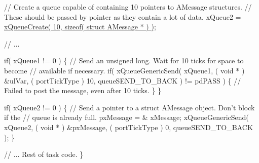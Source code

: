\begin{DoxyPre}   // Create a queue capable of containing 10 pointers to AMessage structures.
   // These should be passed by pointer as they contain a lot of data.
   xQueue2 = \hyperlink{queue_8h_aeb858b824bd74a934ea7ebb81af2a6bb}{xQueueCreate( 10, sizeof( struct AMessage * ) )};\end{DoxyPre}



\begin{DoxyPre}   // ...\end{DoxyPre}



\begin{DoxyPre}   if( xQueue1 != 0 )
   \{
    // Send an unsigned long.  Wait for 10 ticks for space to become
    // available if necessary.
    if( xQueueGenericSend( xQueue1, ( void * ) \&ulVar, ( portTickType ) 10, queueSEND\_TO\_BACK ) != pdPASS )
    \{
        // Failed to post the message, even after 10 ticks.
    \}
   \}\end{DoxyPre}



\begin{DoxyPre}   if( xQueue2 != 0 )
   \{
    // Send a pointer to a struct AMessage object.  Don't block if the
    // queue is already full.
    pxMessage = \& xMessage;
    xQueueGenericSend( xQueue2, ( void * ) \&pxMessage, ( portTickType ) 0, queueSEND\_TO\_BACK );
   \}\end{DoxyPre}



\begin{DoxyPre}   // ... Rest of task code.
\}
\end{DoxyPre}
 